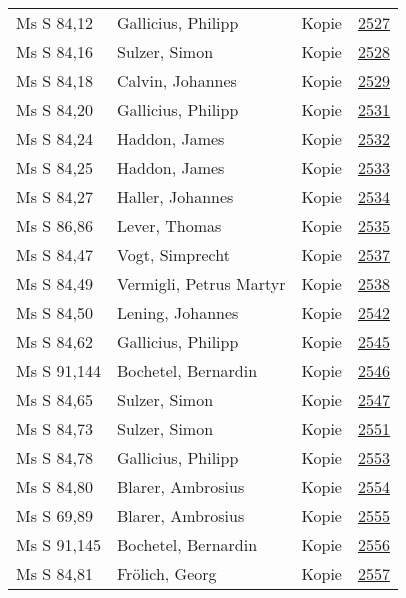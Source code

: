 \documentclass[10pt,a4paper,landscape]{report}
\begin{document}
\begin{longtable}{p{16cm}p{4cm}lr}
Ms S 84,12	&	Gallicius, Philipp	&	Kopie	&	\href{http://130.60.24.72/assignment/2527}{2527}\\
Ms S 84,16	&	Sulzer, Simon	&	Kopie	&	\href{http://130.60.24.72/assignment/2528}{2528}\\
Ms S 84,18	&	Calvin, Johannes	&	Kopie	&	\href{http://130.60.24.72/assignment/2529}{2529}\\
Ms S 84,20	&	Gallicius, Philipp	&	Kopie	&	\href{http://130.60.24.72/assignment/2531}{2531}\\
Ms S 84,24	&	Haddon, James	&	Kopie	&	\href{http://130.60.24.72/assignment/2532}{2532}\\
Ms S 84,25	&	Haddon, James	&	Kopie	&	\href{http://130.60.24.72/assignment/2533}{2533}\\
Ms S 84,27	&	Haller, Johannes	&	Kopie	&	\href{http://130.60.24.72/assignment/2534}{2534}\\
Ms S 86,86	&	Lever, Thomas	&	Kopie	&	\href{http://130.60.24.72/assignment/2535}{2535}\\
Ms S 84,47	&	Vogt, Simprecht	&	Kopie	&	\href{http://130.60.24.72/assignment/2537}{2537}\\
Ms S 84,49	&	Vermigli, Petrus Martyr	&	Kopie	&	\href{http://130.60.24.72/assignment/2538}{2538}\\
Ms S 84,50	&	Lening, Johannes	&	Kopie	&	\href{http://130.60.24.72/assignment/2542}{2542}\\
Ms S 84,62	&	Gallicius, Philipp	&	Kopie	&	\href{http://130.60.24.72/assignment/2545}{2545}\\
Ms S 91,144	&	Bochetel, Bernardin	&	Kopie	&	\href{http://130.60.24.72/assignment/2546}{2546}\\
Ms S 84,65	&	Sulzer, Simon	&	Kopie	&	\href{http://130.60.24.72/assignment/2547}{2547}\\
Ms S 84,73	&	Sulzer, Simon	&	Kopie	&	\href{http://130.60.24.72/assignment/2551}{2551}\\
Ms S 84,78	&	Gallicius, Philipp	&	Kopie	&	\href{http://130.60.24.72/assignment/2553}{2553}\\
Ms S 84,80	&	Blarer, Ambrosius	&	Kopie	&	\href{http://130.60.24.72/assignment/2554}{2554}\\
Ms S 69,89	&	Blarer, Ambrosius	&	Kopie	&	\href{http://130.60.24.72/assignment/2555}{2555}\\
Ms S 91,145	&	Bochetel, Bernardin	&	Kopie	&	\href{http://130.60.24.72/assignment/2556}{2556}\\
Ms S 84,81	&	Frölich, Georg	&	Kopie	&	\href{http://130.60.24.72/assignment/2557}{2557}\\

\end{longtable}
\end{document}
